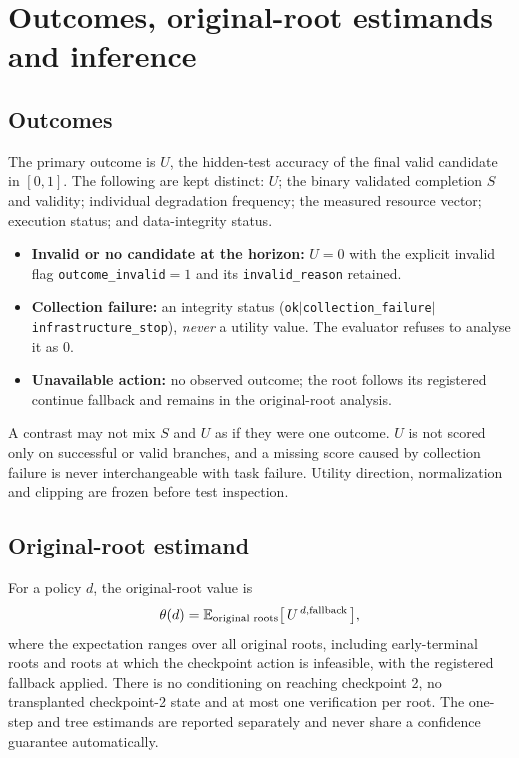 \section{Outcomes, original-root estimands and inference}
\label{sec:b-statistics}

\subsection{Outcomes}

The primary outcome is $U$, the hidden-test accuracy of the final valid candidate
in $[0,1]$.  The following are kept distinct: $U$; the binary validated
completion $S$ and validity; individual degradation frequency; the measured
resource vector; execution status; and data-integrity status.

\begin{itemize}[leftmargin=1.4em]
\item \textbf{Invalid or no candidate at the horizon:} $U=0$ with the explicit
  invalid flag \texttt{outcome\_invalid}$=1$ and its \texttt{invalid\_reason}
  retained.
\item \textbf{Collection failure:} an integrity status
  (\texttt{ok}$\mid$\texttt{collection\_failure}$\mid$\texttt{infrastructure\_stop}),
  \emph{never} a utility value.  The evaluator refuses to analyse it as $0$.
\item \textbf{Unavailable action:} no observed outcome; the root follows its
  registered continue fallback and remains in the original-root analysis.
\end{itemize}

A contrast may not mix $S$ and $U$ as if they were one outcome.  $U$ is not
scored only on successful or valid branches, and a missing score caused by
collection failure is never interchangeable with task failure.  Utility
direction, normalization and clipping are frozen before test inspection.

\subsection{Original-root estimand}

For a policy $d$, the original-root value is
\begin{equation}
 \theta(d)=\mathbb{E}_{\text{original roots}}\big[\,U^{\,d,\text{fallback}}\,\big],
 \label{eq:original-root-value}
\end{equation}
where the expectation ranges over all original roots, including early-terminal
roots and roots at which the checkpoint action is infeasible, with the
registered fallback applied.  There is no conditioning on reaching checkpoint 2,
no transplanted checkpoint-2 state and at most one verification per root.  The
one-step and tree estimands are reported separately and never share a confidence
guarantee automatically.

